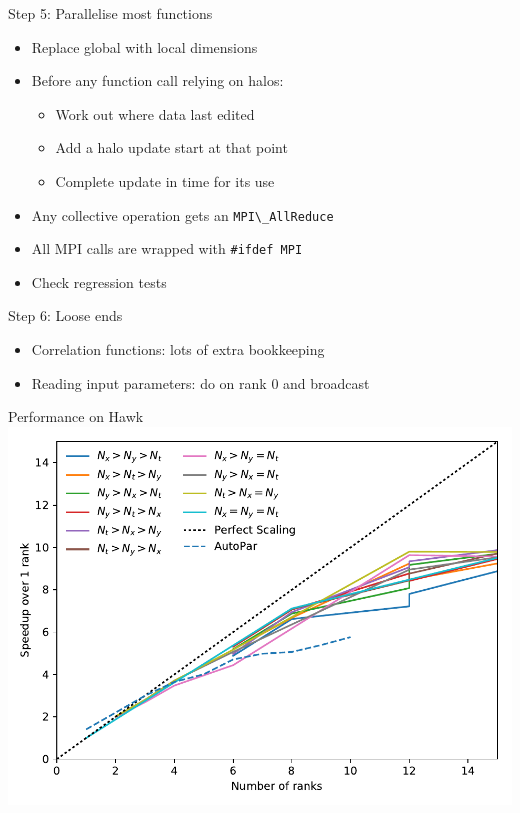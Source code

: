 \documentclass[handout]{beamer}
\begin{document}
\begin{frame}[fragile]{Step 5: Parallelise most functions}
	\begin{itemize}[<+->]
		\item Replace global with local dimensions
		\item Before any function call relying on halos:
		\begin{itemize}[<+->]
			\item Work out where data last edited
			\item Add a halo update start at that point
			\item Complete update in time for its use
		\end{itemize}
		\item Any collective operation gets an \verb|MPI\_AllReduce|
		\item All MPI calls are wrapped with \verb|#ifdef MPI|
		\item Check regression tests
	\end{itemize}
\end{frame}

\begin{frame}{Step 6: Loose ends}
	\begin{itemize}[<+->]
		\item Correlation functions: lots of extra bookkeeping
		\item Reading input parameters: do on rank 0 and broadcast
	\end{itemize}
\end{frame}

\begin{frame}{Performance on Hawk}
	\includegraphics[width=\textwidth]{figs/scaling-hawk}
\end{frame}
\end{document}
